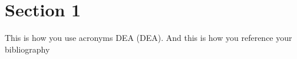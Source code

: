 \section{Section 1}

This is how you use acronyms \acs*{DEA} (\acl*{DEA}). And this is how you reference your bibliography \cite{ExampleArticle}